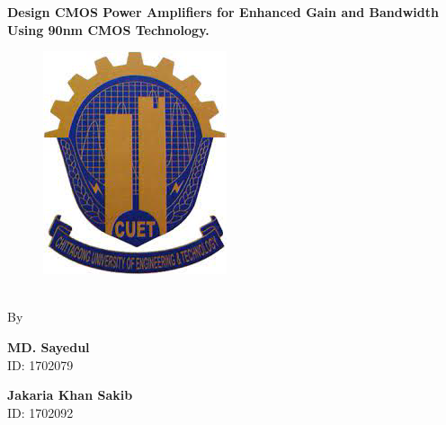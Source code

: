 \thispagestyle{empty}
\begin{center}
   \textbf{\Large{Design CMOS Power Amplifiers for Enhanced Gain and Bandwidth Using 90nm CMOS Technology.}}
\end{center}
\vspace{1cm}

\begin{figure}[!h]
\centering 
\includegraphics[scale=1]
{figures/cuet.png} \\\
\end{figure}

\vspace{1cm}
\centerline{\large{By}}



\begin{center}
\begin{minipage}{0.35\textwidth}
\begin{flushright}
    \textbf{MD. Sayedul}\\
    ID: 1702079
\end{flushright}
\end{minipage}
\hfill
\begin{minipage}{0.35\textwidth}
\begin{flushleft}
    \textbf{Jakaria Khan Sakib}\\
    ID: 1702092
\end{flushleft}
\end{minipage}
\end{center}


